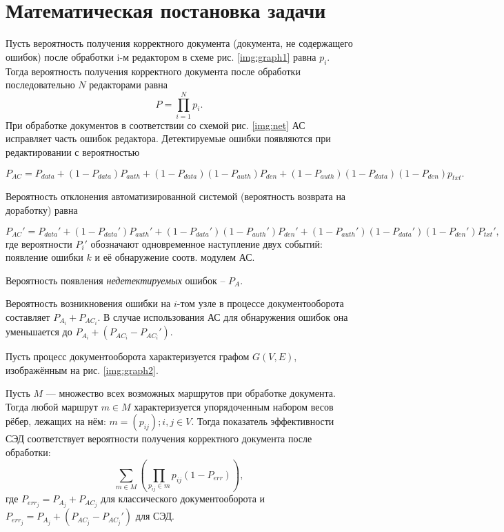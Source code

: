 \section{Математическая постановка задачи} \label{math}

Пусть вероятность получения корректного документа (документа, не содержащего ошибок) после обработки i-м редактором в схеме рис. \ref{img:graph1} равна $p_i$. Тогда вероятность получения корректного документа после обработки последовательно $N$ редакторами равна
$$
P=\prod_{i=1}^N p_i.
$$
При обработке документов в соответствии со схемой рис. \ref{img:net} АС исправляет часть ошибок редактора. Детектируемые ошибки появляются при редактировании с вероятностью

\begin{equation}
  \label{eq:equation3}
P_{AC}=P_{data}+(1-P_{data})P_{auth}+(1-P_{data})(1-P_{auth})P_{den}+(1-P_{auth})(1-P_{data})(1-P_{den})p_{txt}.
\end{equation}

Вероятность отклонения автоматизированной системой (вероятность возврата на доработку) равна

\begin{equation}
  \label{eq:equation4}
P_{AC}'=P_{data}'+(1-P_{data}')P_{auth}'+(1-P_{data}')(1-P_{auth}')P_{den}'+(1-P_{auth}')(1-P_{data}')(1-P_{den}')P_{txt}',
\end{equation}
где вероятности $P_i'$ обозначают одновременное наступление двух событий: появление ошибки $k$ и её обнаружение соотв. модулем АС.

\vspace{\baselineskip}
Вероятность появления \textit{недетектируемых} ошибок -- $P_A$.

\vspace{\baselineskip}
Вероятность возникновения ошибки на $i$-том узле в процессе документооборота составляет $P_{A_i}+P_{{AC}_i}$. В случае использования АС для обнаружения ошибок она уменьшается до $P_{A_i}+(P_{{AC}_i}-P_{{AC}_i}')$.

\vspace{\baselineskip}
Пусть процесс документооборота характеризуется графом $G(V,E)$, изображённым на рис. \ref{img:graph2}.

\vspace{\baselineskip}
Пусть $M$ — множество всех возможных маршрутов при обработке документа. Тогда любой маршрут $m \in M$ характеризуется упорядоченным набором весов рёбер, лежащих на нём: $m=(p_{ij}); i,j \in V$. Тогда показатель эффективности СЭД соответствует вероятности получения корректного документа после обработки:
$$
\sum_{m \in M} (\prod_{p_{ij} \in m} p_{ij}(1-P_{err})),
$$
где $P_{{err}_j}=P_{A_j}+P_{{AC}_j}$ для классического документооборота и $P_{{err}_j}=P_{A_j}+(P_{{AC}_j}-P_{{AC}_j}')$ для СЭД.

